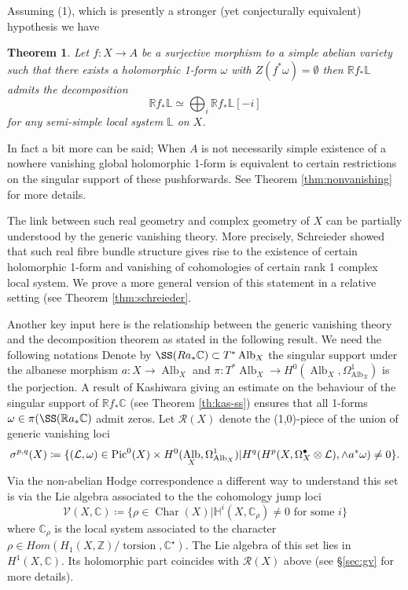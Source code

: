 \documentclass[12pt,reqno]{amsart}
\newtheorem{alphtheorem}{Theorem}
\theoremstyle{question}
\theoremstyle{definition}
\theoremstyle{remark}
\theoremstyle{cited}
\theoremstyle{citeddef}
\DeclareMathOperator{\Alb}{Alb}
\DeclareMathOperator{\Char}{Char}
\def\Pic{{\rm Pic}}
\newcommand{\sL}{\mathcal{L}}
\newcommand{\sR}{\mathcal{R}}
\newcommand\sV{{\mathcal V}}
\newcommand{\bbC}{\mathbb{C}}
\newcommand{\bbH}{\mathbb{H}}
\newcommand{\bbL}{\mathbb{L}}
\newcommand{\bbR}{\mathbb{R}}
\newcommand{\bbZ}{\mathbb{Z}}
\DeclareMathOperator{\torsion}{torsion}
\begin{document}
Assuming (1), which is presently a stronger (yet conjecturally
equivalent) hypothesis we have
\begin{alphtheorem}
Let $f\colon X\to A$ be a surjective morphism to a simple abelian
variety such that there exists a holomorphic 1-form
$\omega$ with $Z(f^*\omega) = \emptyset$ then $\bbR f_*\bbL$
admits the decomposition
\[\bbR f_*\bbL \simeq \bigoplus_i \bbR f_*\bbL[-i]\]
for any semi-simple local system $\bbL$ on $X$. 
\end{alphtheorem}
In fact a bit more can be said; When $A$ is not necessarily simple existence of a nowhere vanishing global holomorphic 1-form
is equivalent to certain restrictions on the singular support of 
these pushforwards. See Theorem \ref{thm:nonvanishing} for more details. 

The link between such
 real geometry and complex geometry of $X$ can be partially
understood
by the generic vanishing theory. More precisely, Schreieder 
showed \cite[Theorem 1.2]{Sch19} that such real fibre bundle structure gives rise to the existence of certain
holomorphic 1-form and vanishing of cohomologies of certain rank 1 complex local system. We prove a more general
version of this statement in a relative setting (see Theorem
\ref{thm:schreieder}. 

 Another key input here is the relationship between the generic vanishing theory and the decomposition
theorem as stated in the following result. We need the following notations
Denote by $\SS(Ra_*\bbC)\subset T^*\Alb_X$ the singular support under the albanese morphism $a\colon X\to \Alb_X$ and $\pi\colon T^*\Alb_X\to 
H^0(\Alb_X, \Omega_{\Alb_X}^1)$ is the porjection. A result of
Kashiwara giving an estimate on the behaviour of the singular
support of $\bbR f_*\bbC$ (see
Theorem \ref{th:kas-ss}) ensures that all 1-forms
$\omega\in \pi(\SS(\bbR a_*\bbC)$ admit zeros. Let $\sR(X)$ denote the (1,0)-piece of the union of generic vanishing loci
\[\sigma^{p,q}(X) \coloneqq \{(\sL,\omega)\in \Pic^0(X)\times H^0(\Alb_X,\Omega_{\Alb_X}^1)|H^q(H^{p}(X, \Omega_X^{\bullet}\otimes \sL), \wedge a^*\omega) \neq 0\}.\]
Via the non-abelian Hodge correspondence a different way to understand this set is via the Lie algebra associated to the  the cohomology jump loci 
\[\sV(X,\bbC) \coloneqq \{\rho\in\Char(X)| \bbH^i(X, \bbC_{\rho})\neq  0\text{ for some } i\} \]
where $\bbC_{\rho}$ is the local system associated 
to the character $\rho\in Hom(H_1(X,\bbZ)/\torsion, \bbC^{\star})$.
The Lie algebra of this set lies in $H^1(X,\bbC)$. Its holomorphic part coincides with $\sR(X)$ above
(see \S \ref{sec:gv} for more details). 
\end{document}
